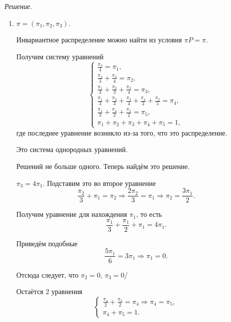 \textit{Решение.}
\begin{enumerate}[label=\alph*)]
  \item $ \pi = \left( \pi_1, \pi_2, \pi_3 \right) $.

  Инвариантное распределение можно найти из условия $ \pi P = \pi $.

  Получим систему уравнений
  \begin{equation*}
    \begin{cases}
      \frac{ \pi_3}{4} = \pi_1, \\
      \frac{ \pi_2}{3} + \frac{ \pi_3}{4} = \pi_2, \\
      \frac{ \pi_1}{3} + \frac{ \pi_2}{3} + \frac{ \pi_3}{4} = \pi_3, \\
      \frac{ \pi_1}{3} + \frac{ \pi_2}{3} + \frac{ \pi_3}{4} + \frac{ \pi_4}{2} + \frac{ \pi_2}{5} =
      \pi_4, \\
      \frac{ \pi_1}{3} + \frac{ \pi_4}{2} + \frac{ \pi_5}{2} = \pi_5, \\
      \pi_1 + \pi_2 + \pi_3 + \pi_4 + \pi_5 = 1,
    \end{cases}
  \end{equation*}
  где последнее уравнение возникло из-за того, что это распределение.

  Это система однородных уравнений.

  Решений не больше одного.
  Теперь найдём это решение.

  $ \pi_3 = 4 \pi_1$.
  Подставим это во второе уравнение
  \begin{equation*}
    \frac{ \pi_2}{3} + \pi_1 = \pi_2 \Rightarrow
    \frac{2 \pi_2}{3} = \pi_1 \Rightarrow
    \pi_2 = \frac{3 \pi_1}{2}.
  \end{equation*}

  Получим уравнение для нахождения $ \pi_1$, то есть
  \begin{equation*}
    \frac{ \pi_1}{3} + \frac{ \pi_1}{2} + \pi_1 =
    4 \pi_1.
  \end{equation*}

  Приведём подобные
  \begin{equation*}
    \frac{5 \pi_1}{6} = 3 \pi_1 \Rightarrow \pi_1 = 0.
  \end{equation*}

  Отсюда следует, что $ \pi_2 = 0, \, \pi_3 = 0$/

  Остаётся 2 уравнения
  \begin{equation*}
    \begin{cases}
      \frac{ \pi_4}{2} + \frac{ \pi_5}{2} = \pi_4 \Rightarrow \pi_4 = \pi_5, \\
      \pi_4 + \pi_5 = 1.
    \end{cases}
  \end{equation*}


\end{enumerate}
